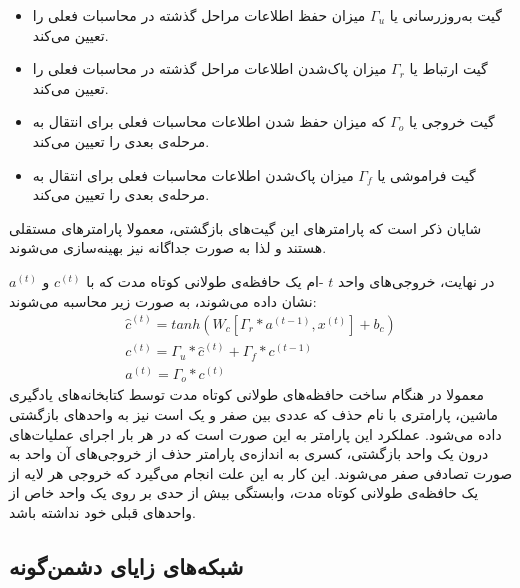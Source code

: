\begin{itemize}
    \item
    گیت به‌روزرسانی یا 
    $\Gamma_u$
    میزان حفظ اطلاعات مراحل گذشته در محاسبات فعلی را تعیین می‌کند.
    
    \item
    گیت ارتباط یا 
    $\Gamma_r$
    میزان پاک‌شدن اطلاعات مراحل گذشته در محاسبات فعلی را تعیین می‌کند.
    
    \item
    گیت خروجی یا 
    $\Gamma_o$
    که میزان حفظ شدن اطلاعات محاسبات فعلی برای انتقال به مرحله‌ی بعدی را تعیین می‌کند.
    
    \item
    گیت فراموشی یا
    $\Gamma_f$
    میزان پاک‌شدن اطلاعات محاسبات فعلی برای انتقال به مرحله‌ی بعدی را تعیین می‌کند.
\end{itemize}

شایان ذکر است که پارامترهای این گیت‌های بازگشتی، معمولا پارامترهای مستقلی هستند و لذا به صورت جداگانه نیز بهینه‌سازی می‌شوند.

در نهایت، خروجی‌های واحد
$t$
-ام یک
حافظه‌ی طولانی کوتاه مدت که با
$c^{(t)}$
و
$a^{(t)}$
نشان داده می‌شوند،
به صورت زیر محاسبه می‌شوند:
\begin{equation}
\begin{gathered}
    \hat{c}^{(t)} = tanh(W_c[\Gamma_r * a^{(t-1)}, x^{(t)}] + b_c) \\
    c^{(t)} = \Gamma_u * \hat{c}^{(t)} + \Gamma_f * c^{(t-1)} \\
    a^{(t)} = \Gamma_o * c^{(t)}
\end{gathered}
\end{equation}
\vspace{-2mm}
معمولا در هنگام ساخت حافظه‌های طولانی کوتاه مدت توسط کتابخانه‌های یادگیری ماشین، پارامتری با نام حذف که عددی بین صفر و یک است نیز به واحدهای بازگشتی داده می‌شود. عملکرد این پارامتر به این صورت است که در هر بار اجرای عملیات‌های درون یک واحد بازگشتی، کسری به اندازه‌ی پارامتر حذف از خروجی‌های آن واحد به صورت تصادفی صفر می‌شوند. این کار به این علت انجام می‌گیرد که خروجی هر لایه از یک حافظه‌ی طولانی کوتاه مدت، وابستگی بیش از حدی بر روی یک واحد خاص از واحدهای قبلی خود نداشته باشد.

\subsection{
شبکه‌های زایای دشمن‌گونه
}

